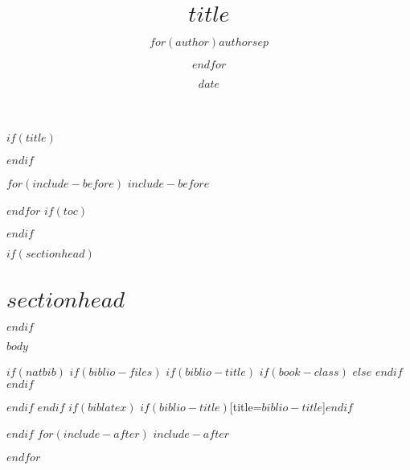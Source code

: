 \documentclass[11pt]{article}
\title{$title$}
\author{$for(author)$$author$$sep$ \and $endfor$}
\date{$date$}
\begin{document}
$if(title)$
\maketitle
$endif$

$for(include-before)$
$include-before$

$endfor$
$if(toc)$
\tableofcontents

$endif$

$if(sectionhead)$
\section{$sectionhead$}
$endif$

$body$

$if(natbib)$
$if(biblio-files)$
$if(biblio-title)$
$if(book-class)$
\renewcommand\bibname{$biblio-title$}
$else$
\renewcommand\refname{$biblio-title$}
$endif$
$endif$


$endif$
$endif$
$if(biblatex)$
\printbibliography$if(biblio-title)$[title=$biblio-title$]$endif$

$endif$
$for(include-after)$
$include-after$

$endfor$
\end{document}
